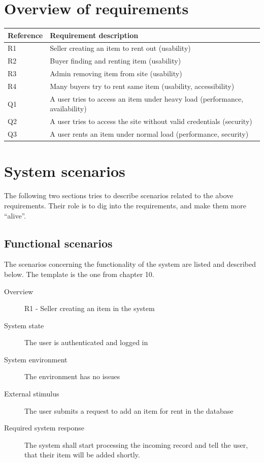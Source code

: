 \documentclass[a4paper,11pt]{report}
\newcommand{\buyers}{ buyers }
\newcommand{\Seller}{ Seller }
\newcommand{\Buyer}{ Buyer }
\begin{document}
\section{Overview of requirements}\label{sec:overv-requ}
\begin{center}
  \begin{tabular}[h]{| l |  l |}
    \hline
    \textbf{Reference} & \textbf{Requirement description} \\
    \hline
    R1 & \Seller creating an item to rent out (usability)\\
    \hline
    R2 & \Buyer finding and renting item (usability)\\
    \hline
    R3 & Admin removing item from site (usability)\\
    \hline
    R4 & Many \buyers try to rent same item (usability, accessibility)\\
    \hline
    Q1 & A user tries to access an item under heavy load (performance, availability)\\
    \hline
    Q2 & A user tries to access the site without valid credentials (security)\\
    \hline
    Q3 & A user rents an item under normal load (performance, security)\\
    \hline
  \end{tabular}
\end{center}

\section{System scenarios}
\label{sec:system-scenarios}
The following two sections tries to describe scenarios related to the above
requirements. Their role is to dig into the requirements, and make them more
``alive''.

\subsection{Functional scenarios}
\label{sec:functional-scenarios}
The scenarios concerning the functionality of the system are listed and
described below. The template is the one from \cite{rozanski2011software}
chapter 10.

\begin{description}
    \item[Overview] R1 - \Seller creating an item in the system
    \item[System state] The user is authenticated and logged in
    \item[System environment] The environment has no issues
    \item[External stimulus] The user submits a request to add an item for rent
        in the database
    \item[Required system response] The system shall start processing the
        incoming record and tell the user, that their item will be added
        shortly.
\end{description}
\end{document}
